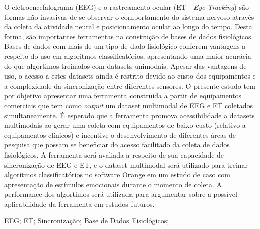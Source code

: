 \documentclass[a4paper, 12pt]{ppgeb}
\begin{document}
O eletroencefalograma (EEG) e o rastreamento ocular (ET - \textit{Eye Tracking}) são 
formas não-invasivas de se observar o comportamento do sistema nervoso através da coleta da atividade
neural e posicionamento ocular ao longo do tempo. Desta forma, são importantes ferramentas na construção de bases de dados fisiológicos. 
Bases de dados com mais de um tipo de dado fisiológico conferem vantagens a respeito
do uso em algoritmos classificatórios, apresentando uma maior acurácia do que algortimos treinados
com datasets unimodais.
Apesar das vantagens de uso, o acesso a estes datasets ainda é restrito devido ao custo
dos equipamentos e a complexidade da sincronização entre diferentes sensores.
O presente estudo tem por objetivo apresentar uma ferramenta construída a partir de equipamentos
comerciais que tem como \textit{output} um dataset multimodal de EEG e ET coletados simultaneamente.
É esperado que a ferramenta promova acessibilidade a datasets multimodais ao gerar uma coleta com 
equipamentos de baixo custo (relativo a equipamentos clínicos) e incentive o desenvolvimento de diferentes áreas de pesquisa que possam se beneficiar do acesso facilitado da coleta de dados fisiológicos. A ferramenta será 
avaliada a respeito de sua capacidade de sincronização de EEG e ET, e o dataset multimodal será utilizado para treinar algoritmos 
classificatórios no software Orange em um estudo de caso com apresentação de estímulos emocionais durante o momento de coleta.
A performance dos algortimos será utilizada para argumentar sobre a possível aplicabilidade da ferramenta em estudos futuros.

\vspace{14pt}

 EEG; ET; Sincronização; Base de Dados Fisiológicos;
\acresetall %
\clearpage
\restoregeometry
\acresetall %
\vspace{24pt}
\end{document}
